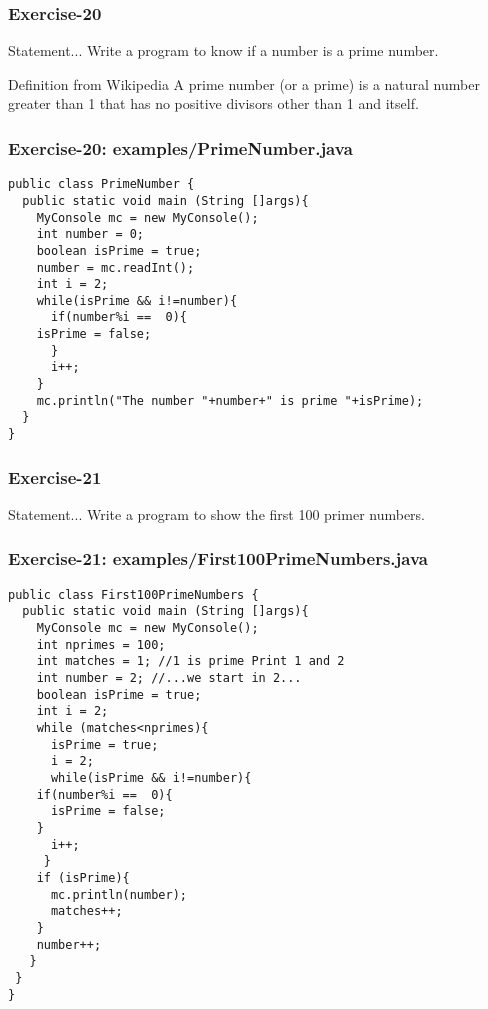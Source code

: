 \documentclass[xcolor=dvipsnames,dvip,notes=show,table]{beamer}
\begin{document}
\begin{frame}[fragile]
\frametitle{Exercise-20}
\begin{block}{Statement...}
Write a program to know if a number is a prime number.
\end{block}

\begin{exampleblock}{Definition from Wikipedia}
 A prime number (or a prime) is a natural number greater than 1 that has no positive divisors other than 1 and itself. 
\end{exampleblock}

\end{frame}


\begin{frame}[fragile]
\frametitle{Exercise-20: examples/PrimeNumber.java}
\scriptsize
\begin{lstlisting}
public class PrimeNumber {
  public static void main (String []args){
    MyConsole mc = new MyConsole();
    int number = 0;
    boolean isPrime = true;
    number = mc.readInt();
    int i = 2;
    while(isPrime && i!=number){
      if(number%i ==  0){
	isPrime = false;
      }
      i++;
    }
    mc.println("The number "+number+" is prime "+isPrime);
  }
}
\end{lstlisting}
\end{frame}




\begin{frame}[fragile]
\frametitle{Exercise-21}
\begin{block}{Statement...}
Write a program to show the first 100 primer numbers.
\end{block}

\end{frame}


\begin{frame}[fragile]
\frametitle{Exercise-21: examples/First100PrimeNumbers.java}
\tiny
\begin{lstlisting}
public class First100PrimeNumbers {
  public static void main (String []args){
    MyConsole mc = new MyConsole();
    int nprimes = 100;
    int matches = 1; //1 is prime Print 1 and 2
    int number = 2; //...we start in 2...
    boolean isPrime = true;			
    int i = 2;
    while (matches<nprimes){
      isPrime = true;
      i = 2;
      while(isPrime && i!=number){
	if(number%i ==  0){
	  isPrime = false;
	}
      i++;
     }
    if (isPrime){
      mc.println(number);
      matches++;
    }
    number++;
   }
 }
}
\end{lstlisting}
\end{frame}
\end{document}
